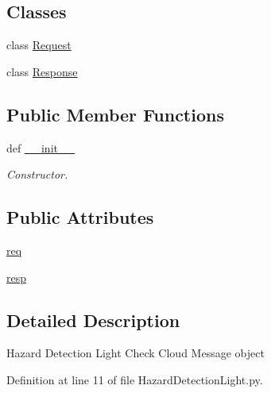 \subsection*{Classes}
\begin{DoxyCompactItemize}
\item 
class \hyperlink{classRappCloud_1_1CloudMsgs_1_1HazardDetectionLight_1_1HazardDetectionLight_1_1Request}{Request}
\item 
class \hyperlink{classRappCloud_1_1CloudMsgs_1_1HazardDetectionLight_1_1HazardDetectionLight_1_1Response}{Response}
\end{DoxyCompactItemize}
\subsection*{Public Member Functions}
\begin{DoxyCompactItemize}
\item 
def \hyperlink{classRappCloud_1_1CloudMsgs_1_1HazardDetectionLight_1_1HazardDetectionLight_adca5531bd9cd6d3b5e7e466856b48e77}{\-\_\-\-\_\-init\-\_\-\-\_\-}
\begin{DoxyCompactList}\small\item\em Constructor. \end{DoxyCompactList}\end{DoxyCompactItemize}
\subsection*{Public Attributes}
\begin{DoxyCompactItemize}
\item 
\hyperlink{classRappCloud_1_1CloudMsgs_1_1HazardDetectionLight_1_1HazardDetectionLight_aa7b0d1e374b7292fd6b3c9061a28217a}{req}
\item 
\hyperlink{classRappCloud_1_1CloudMsgs_1_1HazardDetectionLight_1_1HazardDetectionLight_acbdf04d457b8e7a5d5b5b81b1edafbaa}{resp}
\end{DoxyCompactItemize}


\subsection{Detailed Description}
\begin{DoxyVerb}Hazard Detection Light Check Cloud Message object\end{DoxyVerb}
 

Definition at line 11 of file Hazard\-Detection\-Light.\-py.



